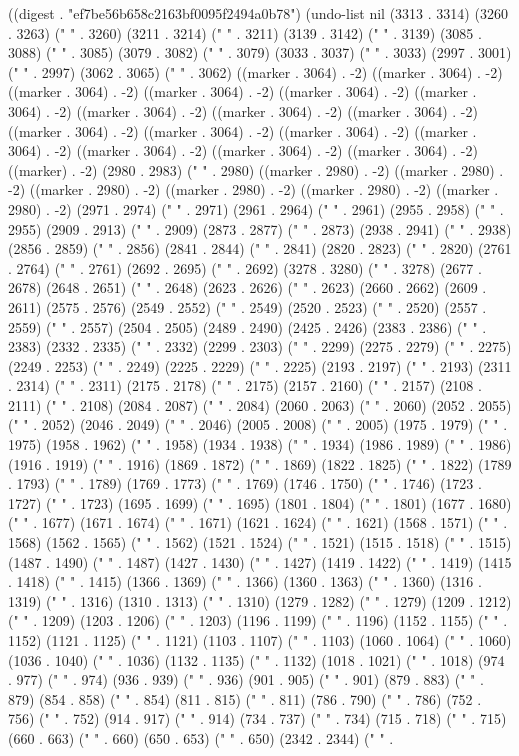 
((digest . "ef7be56b658c2163bf0095f2494a0b78") (undo-list nil (3313 . 3314) (3260 . 3263) ("  " . 3260) (3211 . 3214) ("  " . 3211) (3139 . 3142) ("  " . 3139) (3085 . 3088) ("  " . 3085) (3079 . 3082) ("  " . 3079) (3033 . 3037) ("   " . 3033) (2997 . 3001) ("   " . 2997) (3062 . 3065) ("  " . 3062) ((marker . 3064) . -2) ((marker . 3064) . -2) ((marker . 3064) . -2) ((marker . 3064) . -2) ((marker . 3064) . -2) ((marker . 3064) . -2) ((marker . 3064) . -2) ((marker . 3064) . -2) ((marker . 3064) . -2) ((marker . 3064) . -2) ((marker . 3064) . -2) ((marker . 3064) . -2) ((marker . 3064) . -2) ((marker . 3064) . -2) ((marker . 3064) . -2) ((marker . 3064) . -2) ((marker) . -2) (2980 . 2983) ("  " . 2980) ((marker . 2980) . -2) ((marker . 2980) . -2) ((marker . 2980) . -2) ((marker . 2980) . -2) ((marker . 2980) . -2) ((marker . 2980) . -2) (2971 . 2974) ("  " . 2971) (2961 . 2964) ("  " . 2961) (2955 . 2958) ("  " . 2955) (2909 . 2913) ("   " . 2909) (2873 . 2877) ("   " . 2873) (2938 . 2941) ("  " . 2938) (2856 . 2859) ("  " . 2856) (2841 . 2844) ("  " . 2841) (2820 . 2823) ("  " . 2820) (2761 . 2764) ("  " . 2761) (2692 . 2695) ("  " . 2692) (3278 . 3280) (" " . 3278) (2677 . 2678) (2648 . 2651) (" " . 2648) (2623 . 2626) (" " . 2623) (2660 . 2662) (2609 . 2611) (2575 . 2576) (2549 . 2552) ("  " . 2549) (2520 . 2523) ("  " . 2520) (2557 . 2559) (" " . 2557) (2504 . 2505) (2489 . 2490) (2425 . 2426) (2383 . 2386) ("  " . 2383) (2332 . 2335) ("  " . 2332) (2299 . 2303) ("   " . 2299) (2275 . 2279) ("   " . 2275) (2249 . 2253) ("   " . 2249) (2225 . 2229) ("   " . 2225) (2193 . 2197) ("   " . 2193) (2311 . 2314) ("  " . 2311) (2175 . 2178) ("  " . 2175) (2157 . 2160) ("  " . 2157) (2108 . 2111) ("  " . 2108) (2084 . 2087) ("  " . 2084) (2060 . 2063) ("  " . 2060) (2052 . 2055) ("  " . 2052) (2046 . 2049) ("  " . 2046) (2005 . 2008) ("  " . 2005) (1975 . 1979) ("   " . 1975) (1958 . 1962) ("   " . 1958) (1934 . 1938) ("   " . 1934) (1986 . 1989) ("  " . 1986) (1916 . 1919) ("  " . 1916) (1869 . 1872) ("  " . 1869) (1822 . 1825) ("  " . 1822) (1789 . 1793) ("   " . 1789) (1769 . 1773) ("   " . 1769) (1746 . 1750) ("   " . 1746) (1723 . 1727) ("   " . 1723) (1695 . 1699) ("   " . 1695) (1801 . 1804) ("  " . 1801) (1677 . 1680) ("  " . 1677) (1671 . 1674) ("  " . 1671) (1621 . 1624) ("  " . 1621) (1568 . 1571) ("  " . 1568) (1562 . 1565) ("  " . 1562) (1521 . 1524) ("  " . 1521) (1515 . 1518) ("  " . 1515) (1487 . 1490) ("  " . 1487) (1427 . 1430) ("  " . 1427) (1419 . 1422) ("  " . 1419) (1415 . 1418) ("  " . 1415) (1366 . 1369) ("  " . 1366) (1360 . 1363) ("  " . 1360) (1316 . 1319) ("  " . 1316) (1310 . 1313) ("  " . 1310) (1279 . 1282) ("  " . 1279) (1209 . 1212) ("  " . 1209) (1203 . 1206) ("  " . 1203) (1196 . 1199) ("  " . 1196) (1152 . 1155) ("  " . 1152) (1121 . 1125) ("   " . 1121) (1103 . 1107) ("   " . 1103) (1060 . 1064) ("   " . 1060) (1036 . 1040) ("   " . 1036) (1132 . 1135) ("  " . 1132) (1018 . 1021) ("  " . 1018) (974 . 977) ("  " . 974) (936 . 939) ("  " . 936) (901 . 905) ("   " . 901) (879 . 883) ("   " . 879) (854 . 858) ("   " . 854) (811 . 815) ("   " . 811) (786 . 790) ("   " . 786) (752 . 756) ("   " . 752) (914 . 917) ("  " . 914) (734 . 737) ("  " . 734) (715 . 718) ("  " . 715) (660 . 663) ("  " . 660) (650 . 653) ("  " . 650) (2342 . 2344) (" " . 
